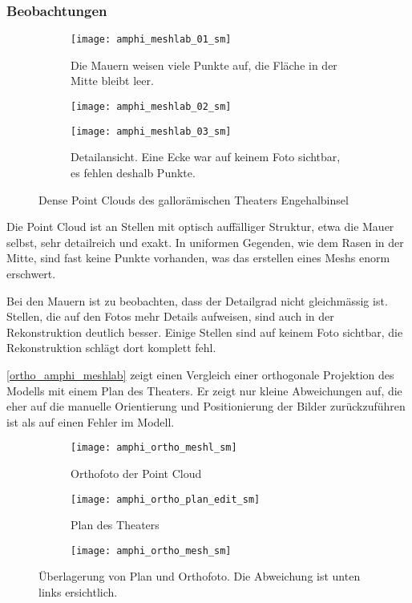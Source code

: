 			\subsubsection{Beobachtungen}
				\begin{figure}
					\vspace*{-4cm}
					\begin{subfigure}{\textwidth}
						\texttt{[image: amphi\_meshlab\_01\_sm]}
						\caption{Die Mauern weisen viele Punkte auf, die Fläche in der Mitte bleibt leer.}
						\label{amphi_res_1}
					\end{subfigure}
					\begin{subfigure}{\textwidth}
						\texttt{[image: amphi\_meshlab\_02\_sm]}
						\caption{}
						\label{amphi_res_2}
					\end{subfigure}
					\begin{subfigure}{\textwidth}
						\texttt{[image: amphi\_meshlab\_03\_sm]}
						\caption{Detailansicht. Eine Ecke war auf keinem Foto sichtbar, es fehlen deshalb Punkte.}
						\label{amphi_res_3}
					\end{subfigure}
					\caption{Dense Point Clouds des gallorämischen Theaters Engehalbinsel}
					\label{amphi_res}
				\end{figure}
				Die Point Cloud ist an Stellen mit optisch auffälliger Struktur, etwa die Mauer selbst, sehr detailreich und exakt. In uniformen Gegenden, wie dem Rasen in der Mitte, sind fast keine Punkte vorhanden, was das erstellen eines Meshs enorm erschwert.
								
				Bei den Mauern ist zu beobachten, dass der Detailgrad nicht gleichmässig ist. Stellen, die auf den Fotos mehr Details aufweisen, sind auch in der Rekonstruktion deutlich besser.
				Einige Stellen sind auf keinem Foto sichtbar, die Rekonstruktion schlägt dort komplett fehl.
				
				\autoref{ortho_amphi_meshlab} zeigt einen Vergleich einer orthogonale Projektion des Modells mit einem Plan des Theaters. Er zeigt nur kleine Abweichungen auf, die eher auf die manuelle Orientierung und Positionierung der Bilder zurückzuführen ist als auf einen Fehler im Modell.
				\begin{figure}
					\begin{subfigure}{0.4\textwidth}
						\texttt{[image: amphi\_ortho\_meshl\_sm]}
						\caption{Orthofoto der Point Cloud}
					\end{subfigure}	
					\begin{subfigure}{0.4\textwidth}
						\texttt{[image: amphi\_ortho\_plan\_edit\_sm]}
						\caption{Plan des Theaters}
					\end{subfigure}
					\begin{subfigure}{\textwidth}
						\texttt{[image: amphi\_ortho\_mesh\_sm]}
					\end{subfigure}
					\caption[Überlagerung von Plan und Orthofoto. Plan aus \cite{engehalb}]{Überlagerung von Plan und Orthofoto. Die Abweichung ist unten links ersichtlich.}
					\label{ortho_amphi_meshlab}
				\end{figure}
				
